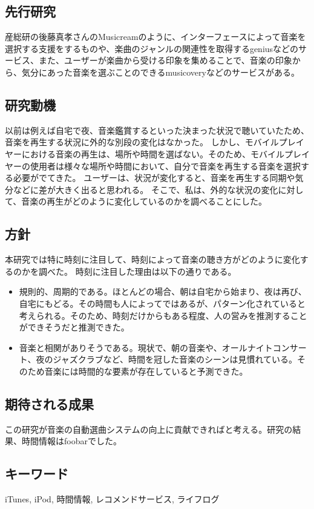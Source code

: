 \documentclass{jsarticle}
\begin{document}
\subsection{先行研究}
産総研の後藤真孝さんのMusicreamのように、インターフェースによって音楽を選択する支援をするものや、楽曲のジャンルの関連性を取得するgeniusなどのサービス、また、ユーザーが楽曲から受ける印象を集めることで、音楽の印象から、気分にあった音楽を選ぶことのできるmusicoveryなどのサービスがある。

\subsection{研究動機}

以前は例えば自宅で夜、音楽鑑賞するといった決まった状況で聴いていたため、音楽を再生する状況に外的な別段の変化はなかった。
しかし、モバイルプレイヤーにおける音楽の再生は、場所や時間を選ばない。そのため、モバイルプレイヤーの使用者は様々な場所や時間において、自分で音楽を再生する音楽を選択する必要がでてきた。
ユーザーは、状況が変化すると、音楽を再生する同期や気分などに差が大きく出ると思われる。
そこで、私は、外的な状況の変化に対して、音楽の再生がどのように変化しているのかを調べることにした。
\subsection{方針}
本研究では特に時刻に注目して、時刻によって音楽の聴き方がどのように変化するのかを調べた。
時刻に注目した理由は以下の通りである。
\begin{itemize}
\item
規則的、周期的である。ほとんどの場合、朝は自宅から始まり、夜は再び、自宅にもどる。その時間も人によってではあるが、パターン化されていると考えられる。そのため、時刻だけからもある程度、人の営みを推測することができそうだと推測できた。
\item
音楽と相関がありそうである。現状で、朝の音楽や、オールナイトコンサート、夜のジャズクラブなど、時間を冠した音楽のシーンは見慣れている。そのため音楽には時間的な要素が存在していると予測できた。
\end{itemize}

\subsection{期待される成果}
この研究が音楽の自動選曲システムの向上に貢献できればと考える。研究の結果、時間情報はfoobarでした。
\subsection{キーワード}
iTunes, iPod, 時間情報, レコメンドサービス, ライフログ
\end{document}

